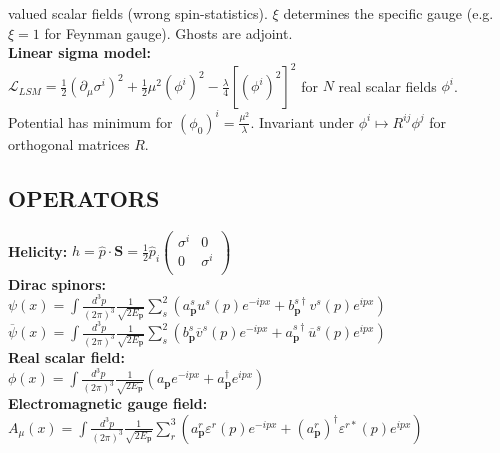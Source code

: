 \documentclass[a4paper, norsk, 8pt, landscape]{article}
\begin{document}
\begin{multicols*}{3}
valued scalar fields (wrong spin-statistics). $\xi$ determines the specific gauge
(e.g. $\xi=1$ for Feynman gauge). Ghosts are adjoint.
\\
 {\textbf{Linear sigma model:}} \\
$\mathcal{L}_{LSM} = \frac{1}{2}(\partial_\mu \sigma^i)^2+\frac{1}{2}\mu^2(\phi^i)^2-\frac{\lambda}{4}[(\phi^i)^2]^2$
for $N$ real scalar fields $\phi^i$. Potential has minimum for $(\phi_0)^i=\frac{\mu^2}{\lambda}$.
Invariant under $\phi^i \mapsto R^{ij}\phi^j$ for orthogonal matrices $R$.
















\subsection*{\small  OPERATORS}
 {\textbf{Helicity:}}
$h=\hat{p}\cdot \mathbf{S}=\frac{1}{2}\hat{p}_i
\left(\begin{matrix}
\sigma^i &        0 \\
0        & \sigma^i \\
\end{matrix}\right)$
\\
 {\textbf{Dirac spinors:}} \\
$\psi(x)=\int \frac{d^3 p}{(2\pi)^3}
\frac{1}{\sqrt{2E_\mathbf{p}}}
\sum_s^2\left(a_\mathbf{p}^s u^s(p)e^{-ipx}+b_\mathbf{p}^{s\dagger}  v^s(p)e^{ipx}\right)$ \\
$\overline{\psi}(x)=\int \frac{d^3 p}{(2\pi)^3}
\frac{1}{\sqrt{2E_\mathbf{p}}}
\sum_s^2\left(b_\mathbf{p}^s \overline{v}^s(p)e^{-ipx}+a_\mathbf{p}^{s\dagger} \overline{u}^s(p)e^{ipx}\right)$
\\
 {\textbf{Real scalar field:}} \\
$\phi(x)=\int \frac{d^3 p}{(2\pi)^3} \frac{1}{\sqrt{2E_\mathbf{p}}}
\left(a_\mathbf{p}e^{-ipx}+a_\mathbf{p}^\dagger e^{ipx}\right)$
\\
 {\textbf{Electromagnetic gauge field:}} \\
$A_\mu(x)=\int \frac{d^3 p}{(2\pi)^3}
\frac{1}{\sqrt{2E_\mathbf{p}}}
\sum_r^3\left(a_\mathbf{p}^r \varepsilon^r(p)e^{-ipx}+(a_\mathbf{p}^r)^\dagger \varepsilon^{r*}(p) e^{ipx}\right)$


















\end{multicols*}
\end{document}
